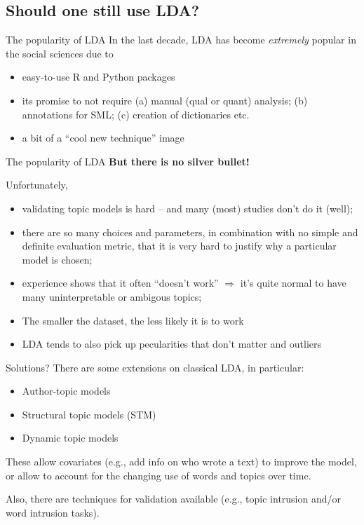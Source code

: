 	
	
	\subsection{Should one still use LDA?}
	
	
	\begin{frame}{The popularity of LDA}
	In the last decade, LDA has become \emph{extremely} popular in the social sciences due to
	  \begin{itemize}
	  \item easy-to-use R and Python packages
	  \item its promise to not require (a) manual (qual or quant) analysis; (b) annotations for SML; (c) creation of dictionaries etc.
	  \item a bit of a ``cool new technique'' image
	  \end{itemize}
	\end{frame}
	
	
	\begin{frame}{The popularity of LDA}
	  \textbf{But there is no silver bullet!}
	
	  Unfortunately,
	  \begin{itemize}
	  \item validating topic models is hard -- and many (most) studies don't do it (well);
	  \item there are so many choices and parameters, in combination with no simple and definite evaluation metric, that it is very hard to justify why a particular model is chosen;
	  \item experience shows that it often ``doesn't work'' $\Rightarrow$ it's quite normal to have many uninterpretable or ambigous topics;
	  \item The smaller the dataset, the less likely it is to work
	  \item LDA tends to also pick up pecularities that don't matter and outliers
	  \end{itemize}
	\end{frame}
	
	
	\begin{frame}{Solutions?}
	There are some extensions on classical LDA, in particular:
	\begin{itemize}
	\item Author-topic models
	\item Structural topic models (STM) \parencite{Roberts2014}
	\item Dynamic topic models \parencite{Blei2006}
	\end{itemize}
	
	These allow covariates (e.g., add info on who wrote a text) to improve the model, or allow to account for the changing use of words and topics over time.
	
	Also, there are techniques for validation available (e.g., topic intrusion and/or word intrusion tasks).
	\end{frame}
	
